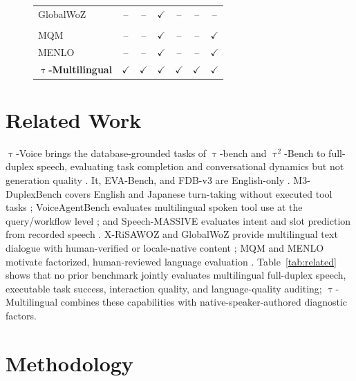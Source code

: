 \documentclass{article}
\newcommand{\tauvoice}{$\uptau$-Voice}
\newcommand{\taumulti}{$\uptau$-Multilingual}
\begin{document}
\begin{figure}[!t]
\begin{tabular*}{\columnwidth}{@{\extracolsep{\fill}}lcccccc@{}}
GlobalWoZ \cite{ding2022globalwoz}
  & -- & -- & $\checkmark$ & -- & -- & -- \\
\addlinespace[2pt]
\multicolumn{7}{l}{\textit{Language-quality evaluation}} \\
MQM \cite{freitag2021mqm}
  & -- & -- & $\checkmark$ & -- & -- & $\checkmark$ \\
MENLO \cite{whitehouse2026menlo}
  & -- & -- & $\checkmark$ & -- & -- & $\checkmark$ \\
\midrule
\textbf{\taumulti{}}
  & $\checkmark$ & $\checkmark$ & $\checkmark$ & $\checkmark$ & $\checkmark$ & $\checkmark$ \\
\bottomrule
\end{tabular*}
\vspace{3pt}
\end{figure}

\section{Related Work}
\label{sec:related-work}

\tauvoice{} brings the database-grounded tasks of $\uptau$-bench and
$\uptau^2$-Bench \cite{yao2024taubench,barres2025tau2bench} to full-duplex
speech, evaluating task completion and conversational dynamics but not generation
quality \cite{ray2026tauvoice}. It, EVA-Bench, and FDB-v3 are English-only
\cite{bogavelli2026evabench,lin2026fdbv3}. M3-DuplexBench covers
English and Japanese turn-taking without executed tool tasks
\cite{fukuda2026m3duplexbench}; VoiceAgentBench evaluates multilingual spoken
tool use at the query/workflow level \cite{jain2025voiceagentbench}; and
Speech-MASSIVE evaluates intent and slot prediction from recorded speech
\cite{lee2024speechmassive}.
X-RiSAWOZ and GlobalWoZ provide multilingual text dialogue with human-verified
or locale-native content \cite{moradshahi2023xrisawoz,ding2022globalwoz}; MQM
and MENLO motivate factorized, human-reviewed language evaluation
\cite{freitag2021mqm,whitehouse2026menlo}. Table~\ref{tab:related}
shows that no prior benchmark jointly evaluates multilingual full-duplex
speech, executable task success, interaction quality, and language-quality
auditing; \taumulti{} combines these capabilities with native-speaker-authored
diagnostic factors.


\section{Methodology}
\label{sec:methods}
\end{document}
